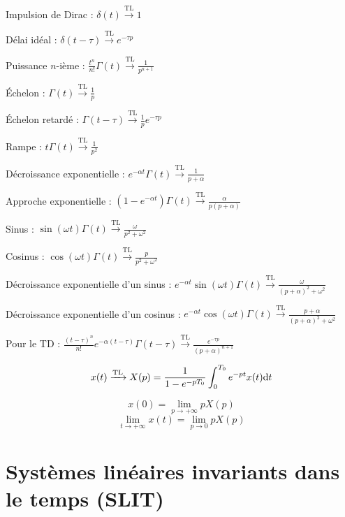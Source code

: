 \documentclass[a4paper,12pt]{article}
\begin{document}
Impulsion de Dirac : $\delta (t) \xrightarrow{\mathrm{TL}} 1$

Délai idéal : $\delta (t - \tau) \xrightarrow{\mathrm{TL}} e^{-\tau p}$

Puissance $n$-ième : $\frac{t^n}{n!} \Gamma(t) \xrightarrow{\mathrm{TL}} \frac{1}{p^{n+1}}$

Échelon : $\Gamma(t) \xrightarrow{\mathrm{TL}} \frac{1}{p}$

Échelon retardé : $\Gamma(t-\tau) \xrightarrow{\mathrm{TL}} \frac{1}{p}e^{-\tau p}$

Rampe : $t\Gamma(t) \xrightarrow{\mathrm{TL}} \frac{1}{p^2}$

Décroissance exponentielle : $e^{-\alpha t} \Gamma(t) \xrightarrow{\mathrm{TL}} \frac{1}{p+\alpha}$

Approche exponentielle : $(1 - e^{-\alpha t}) \Gamma(t) \xrightarrow{\mathrm{TL}} \frac{\alpha}{p(p + \alpha)}$

Sinus : $\sin(\omega t) \Gamma(t) \xrightarrow{\mathrm{TL}} \frac{\omega}{p^2 + \omega^2}$

Cosinus : $\cos(\omega t) \Gamma(t) \xrightarrow{\mathrm{TL}} \frac{p}{p^2 + \omega^2}$

Décroissance exponentielle d'un sinus : $e^{-\alpha t} \sin(\omega t) \Gamma(t) \xrightarrow{\mathrm{TL}} \frac{\omega}{(p + \alpha)^2 + \omega^2}$

Décroissance exponentielle d'un cosinus : $e^{-\alpha t} \cos(\omega t) \Gamma(t) \xrightarrow{\mathrm{TL}} \frac{p + \alpha}{(p + \alpha)^2 + \omega^2}$

Pour le TD : $\frac{(t-\tau)^n}{n!} e^{-\alpha (t-\tau)} \Gamma(t-\tau) \xrightarrow{\mathrm{TL}} \frac{e^{-\tau p}}{(p+\alpha)^{n+1}}$

\begin{defi}
    \[ x(t) \xrightarrow{\mathrm{TL}} X(p) = \dfrac{1}{1-e^{-pT_0}} \int_0^{T_0} e^{-pt} x(t) \mathrm{d}t \]
\end{defi}

\begin{defi}
    \[ x(0) = \lim_{p \to +\infty} pX(p)\]
    \[ \lim_{t \to +\infty} x(t) = \lim_{p \to 0} pX(p) \]
\end{defi}

\section{Systèmes linéaires invariants dans le temps (SLIT)}
\end{document}
